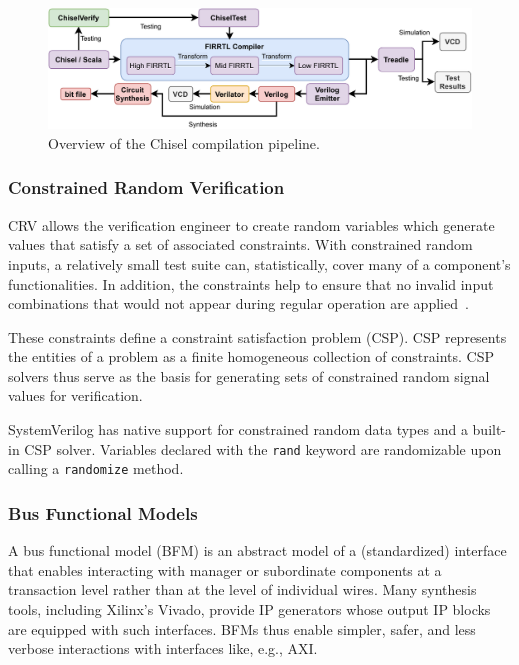 \documentclass[conference]{IEEEtran}
\begin{document}
\begin{figure}
  \centering
    \includegraphics[width=0.8\linewidth]{Chisel_FIRRTL_VERILOG.pdf}
    \caption{Overview of the Chisel compilation pipeline.}
\label{fig:chisel-pipe}
\end{figure}

\subsubsection{Constrained Random Verification}
CRV allows the verification engineer to create random variables which generate values that satisfy a set of associated constraints.
With constrained random inputs, a relatively small test suite can, statistically, cover many of a component's functionalities. 
In addition, the constraints help to ensure that no invalid input combinations that would not appear during regular operation are applied~\cite{MehtaCRV2018}.

These constraints define a constraint satisfaction problem (CSP).
CSP represents the entities of a problem as a finite homogeneous collection of constraints. 
CSP solvers thus serve as the basis for generating sets of constrained random signal values for verification.

SystemVerilog has native support for constrained random data types and a built-in CSP solver. 
Variables declared with the \texttt{rand} keyword are randomizable upon calling a \texttt{randomize} method.

\subsubsection{Bus Functional Models}
A bus functional model (BFM) is an abstract model of a (standardized) interface that enables interacting with manager or subordinate components at a transaction level rather than at the level of individual wires.
Many synthesis tools, including Xilinx's Vivado, provide IP generators whose output IP blocks are equipped with such interfaces. 
BFMs thus enable simpler, safer, and less verbose interactions with interfaces like, e.g., AXI.
\end{document}
